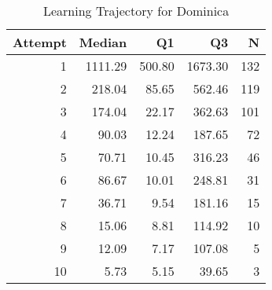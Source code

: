 \begin{table}[htbp]
\centering
\caption{Learning Trajectory for Dominica}
\label{tab:learning-trajectory}
\begin{tabular}{rrrrr}
\toprule
Attempt & Median & Q1 & Q3 & N \\
\midrule
1 & 1111.29 & 500.80 & 1673.30 & 132 \\
2 & 218.04 & 85.65 & 562.46 & 119 \\
3 & 174.04 & 22.17 & 362.63 & 101 \\
4 & 90.03 & 12.24 & 187.65 & 72 \\
5 & 70.71 & 10.45 & 316.23 & 46 \\
6 & 86.67 & 10.01 & 248.81 & 31 \\
7 & 36.71 & 9.54 & 181.16 & 15 \\
8 & 15.06 & 8.81 & 114.92 & 10 \\
9 & 12.09 & 7.17 & 107.08 & 5 \\
10 & 5.73 & 5.15 & 39.65 & 3 \\
\bottomrule
\end{tabular}
\end{table}
